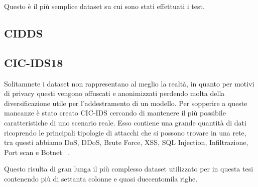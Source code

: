 Questo è il più semplice dataset su cui sono stati effettuati i test.

\subsection{CIDDS}


\subsection{CIC-IDS18}

Solitamnete i dataset non rappresentano al meglio la realtà, in quanto per motivi di privacy questi vengono offuscati e anonimizzati perdendo molta della diversificazione utile per l'addestramento di un modello.
Per sopperire a queste mancanze è stato creato CIC-IDS cercando di mantenere il più possibile caratteristiche di uno scenario reale.
Esso contiene una grande quantità di dati ricoprendo le principali tipologie di attacchi che si possono trovare in una rete, tra questi abbiamo DoS, DDoS, Brute Force, XSS, SQL Injection, Infiltrazione, Port scan e Botnet ~\cite{sharafaldinGeneratingNewIntrusion2018}.

Questo risulta di gran lunga il più complesso dataset utilizzato per in questa tesi contenendo più di settanta colonne e quasi duecentomila righe.

